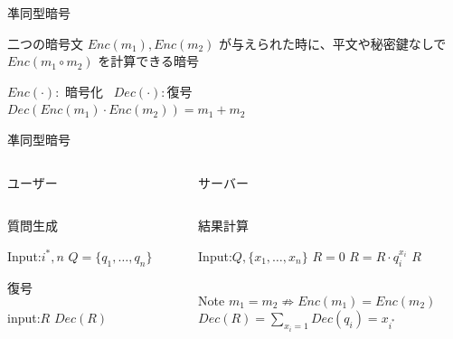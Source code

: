 \documentclass[14pt,xcolor=dvipsnames,table,dvipdfmx]{beamer}
\begin{document}
\begin{frame}{凖同型暗号}
	\begin{Definition}[凖同型暗号]
		二つの暗号文 $Enc(m_1), Enc (m_2)$ が与えられた時に、平文や秘密鍵なしで $Enc( m_1 \circ m_2 )$ を計算できる暗号
	\end{Definition}
	\begin{Example}[加算ができる凖同型暗号]
		$Enc(\cdot):$ 暗号化 \, $Dec(\cdot):$復号 \\
		$ Dec(Enc(m_1) \cdot Enc (m_2)) = m_1 + m_2$
	\end{Example}
\end{frame}
\begin{frame}{凖同型暗号}
\fontsize{12pt}{7.2}\selectfont
    \begin{columns}[t]
        \begin{column}{0.5\textwidth}
			\begin{block}{ユーザー} 
			\begin{columns}[t]
				\begin{column}{0.8\textwidth}
				\begin{block}{質問生成}
				\begin{algorithmic}[1]
					\STATE Input:$i^*,n$
					\ELSE
					\ENDIF
					\ENDFOR
					\RETURN $Q = \{q_1, \dots, q_n\}$
				\end{algorithmic}
				\end{block}
				\begin{block}{復号}
				\begin{algorithmic}[1]
					\STATE input:$R$
					\RETURN $Dec(R)$
				\end{algorithmic}
				\end{block}
				\end{column}
			\end{columns}
			\end{block}
        \end{column}
        \begin{column}{0.5\textwidth}
			\begin{block}{サーバー} 
			\begin{columns}[t]
				\begin{column}{0.8\textwidth}
				\begin{block}{結果計算}
				\begin{algorithmic}[1]
					\STATE Input:$Q,\{x_1, \dots, x_n \}$
					\STATE $R = 0$
					\FOR{$i = 1, \dots, n$}
					\STATE $R = R \cdot q_i^{x_i}$
					\ENDFOR
					\RETURN $R$
				\end{algorithmic}
				\end{block}
				\end{column}
			\end{columns}
			\end{block}
			\begin{block}{Note}
				$m_1 = m_2 \nRightarrow Enc(m_1) = Enc(m_2)$ \\
				$Dec(R) = \sum_{x_i = 1}Dec(q_i) = x_{i^*}$
			\end{block}
        \end{column}
    \end{columns}
\end{frame}
\end{document}
